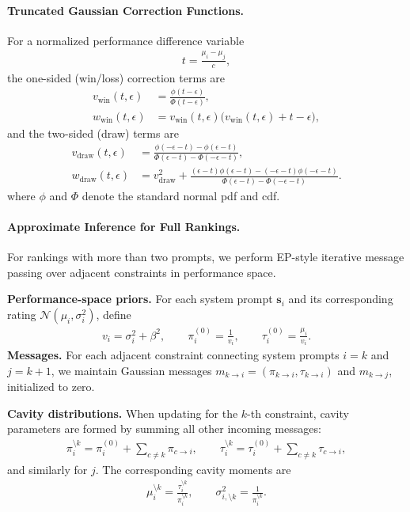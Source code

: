 \documentclass{article}
\theoremstyle{plain}
\theoremstyle{definition}
\theoremstyle{remark}
\begin{document}
\paragraph{Truncated Gaussian Correction Functions.}
For a normalized performance difference variable
\begin{align*}
t=\frac{\mu_i-\mu_j}{c},
\end{align*}
the one-sided (win/loss) correction terms are
\begin{align*}
v_{\text{win}}(t,\epsilon) &= \frac{\phi(t-\epsilon)}{\Phi(t-\epsilon)}, \\
w_{\text{win}}(t,\epsilon) &= v_{\text{win}}(t,\epsilon)\big(v_{\text{win}}(t,\epsilon)+t-\epsilon\big),
\end{align*}
and the two-sided (draw) terms are
\begin{align*}
v_{\text{draw}}(t,\epsilon)
&=\frac{\phi(-\epsilon-t)-\phi(\epsilon-t)}
{\Phi(\epsilon-t)-\Phi(-\epsilon-t)}, \\
w_{\text{draw}}(t,\epsilon)
&=v_{\text{draw}}^2+\frac{(\epsilon-t)\phi(\epsilon-t)-(-\epsilon-t)\phi(-\epsilon-t)}
{\Phi(\epsilon-t)-\Phi(-\epsilon-t)} .
\end{align*}
where $\phi$ and $\Phi$ denote the standard normal pdf and cdf.

\paragraph{Approximate Inference for Full Rankings.}
For rankings with more than two prompts, we perform EP-style iterative message passing \citep{minka2001family} over adjacent constraints in performance space.

\textbf{Performance-space priors.}  
For each system prompt $\mathbf{s}_{i}$ and its corresponding rating $\mathcal{N}(\mu_{i}, \sigma_{i}^{2})$, define
\begin{align*}
v_i=\sigma_i^2+\beta^2, \qquad
\pi_i^{(0)}=\frac{1}{v_i}, \qquad
\tau_i^{(0)}=\frac{\mu_i}{v_i}.
\end{align*}
\textbf{Messages.}  
For each adjacent constraint connecting system prompts $i=k$ and $j=k+1$, we maintain Gaussian messages
$m_{k\to i}=(\pi_{k\to i},\tau_{k\to i})$ and $m_{k\to j}$, initialized to zero.

\textbf{Cavity distributions.}  
When updating for the $k$-th constraint, cavity parameters are formed by summing all other incoming messages:
\begin{align*}
\pi_i^{\setminus k}=\pi_i^{(0)}+\sum_{c\neq k}\pi_{c\to i}, \qquad
\tau_i^{\setminus k}=\tau_i^{(0)}+\sum_{c\neq k}\tau_{c\to i},
\end{align*}
and similarly for $j$. The corresponding cavity moments are
\begin{align*}
\mu_i^{\setminus k}=\frac{\tau_i^{\setminus k}}{\pi_i^{\setminus k}}, \qquad
\sigma_{i,\setminus k}^2=\frac{1}{\pi_i^{\setminus k}} .
\end{align*}
\end{document}
